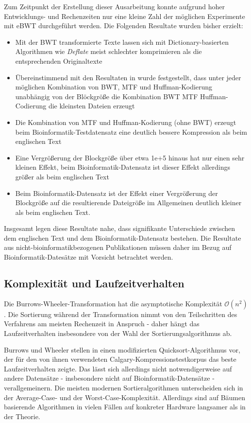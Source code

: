 \documentclass[ngerman,pdftex,paper=A4,DIV=calc,titlepage,12pt]{scrartcl}
\newtheorem[L]{boxedDefinition}{Definition}
\begin{document}
Zum Zeitpunkt der Erstellung dieser Ausarbeitung konnte aufgrund hoher Entwicklungs- und Rechenzeiten nur eine kleine Zahl der möglichen Experimente mit eBWT durchgeführt werden. Die Folgenden Resultate wurden bisher erzielt:
\begin{itemize}
 \item Mit der BWT transformierte Texte lassen sich mit Dictionary-basierten Algorithmen wie \textit{Deflate} meist schlechter komprimieren als die entsprechenden Originaltexte
 \item Übereinstimmend mit den Resultaten in \cite{burrows1994block} wurde festgestellt, dass unter jeder möglichen Kombination von BWT, MTF und Huffman-Kodierung unabhängig von der Blöckgröße die Kombination BWT \textrightarrow MTF \textrightarrow Huffman-Codierung die kleinsten Dateien erzeugt
 \item Die Kombination von MTF und Huffman-Kodierung (ohne BWT) erzeugt beim Bioinformatik-Testdatensatz eine deutlich bessere Kompression als beim englischen Text
 \item Eine Vergrößerung der Blockgröße über etwa 1e+5 hinaus hat nur einen sehr kleinen Effekt, beim Bioinformatik-Datensatz ist dieser Effekt allerdings größer als beim englischen Text
 \item Beim Bioinformatik-Datensatz ist der Effekt einer Vergrößerung der Blockgröße auf die resultierende Dateigröße im Allgemeinen deutlich kleiner als beim englischen Text.
\end{itemize}
Insgesamt legen diese Resultate nahe, dass signifikante Unterschiede zwischen dem englischen Text und dem Bioinformatik-Datensatz bestehen. Die Resultate aus nicht-bioinformatikbezogenen Publikationen müssen daher im Bezug auf Bioinformatik-Datesätze mit Vorsicht betrachtet werden.
\subsection{Komplexität und Laufzeitverhalten}\label{ssec:complexity}
Die Burrows-Wheeler-Transformation hat die asymptotische Komplexität $\mathcal{O}(n^2)$. Die Sortierung während der Transformation nimmt von den Teilschritten des Verfahrens am meisten Rechenzeit in Anspruch - daher hängt das Laufzeitverhalten insbesondere von der Wahl der Sortierungsalgorithmus ab.

Burrows und Wheeler stellen in \cite{burrows1994block} einen modifizierten Quicksort-Algorithmus vor, der für den von ihnen verwendeten Calgary-Kompressionstestkorpus das beste Laufzeitverhalten zeigte. Das lässt sich allerdings nicht notwendigerweise auf andere Datensätze - insbesondere nicht auf Bioinformatik-Datensätze - verallgemeinern.
Die meisten modernen Sortieralgorithmen unterscheiden sich in der Average-Case- und der Worst-Case-Komplexität. Allerdings sind auf Bäumen basierende Algorithmen in vielen Fällen auf konkreter Hardware langsamer als in der Theorie.
\end{document}
